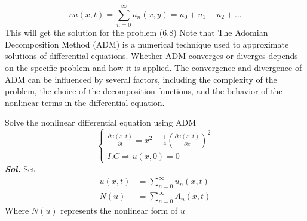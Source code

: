 \[
    \therefore u(x,t) = \sum_{n=0}^{\infty} u_n(x,y) = u_0 + u_1 + u_2 + \dots
\]
This will get the solution for the problem (6.8)
\newpage
Note that The Adomian Decomposition Method (ADM)
is a numerical technique used to approximate solutions
of differential equations.
Whether ADM converges or diverges depends on the
specific problem and how it is applied.
The convergence and divergence of ADM can be
influenced by several factors, including the
complexity of the problem, the choice of the
decomposition functions, and the behavior of
the nonlinear terms in the differential equation.

\begin{example}
    Solve the nonlinear differential equation using ADM
    \begin{equation}
        \begin{cases}
            \displaystyle \frac{\partial u(x,t)}{\partial t} = x^2 - \frac{1}{4}\left( \frac{\partial u(x,t)}{\partial x} \right)^2
            \\
            I.C \Longrightarrow \displaystyle u(x,0) = 0
        \end{cases}
    \end{equation}
    \textit{ \textbf{Sol.} } Set
    \begin{align*}
        u(x,t) & = \sum_{n=0}^{\infty} u_n(x,t)
        \\
        N(u)   & = \sum_{n=0}^{\infty} A_n(x,t)
    \end{align*}
    Where $N(u)$ represents the nonlinear form of $u$ 
    

\end{example}
